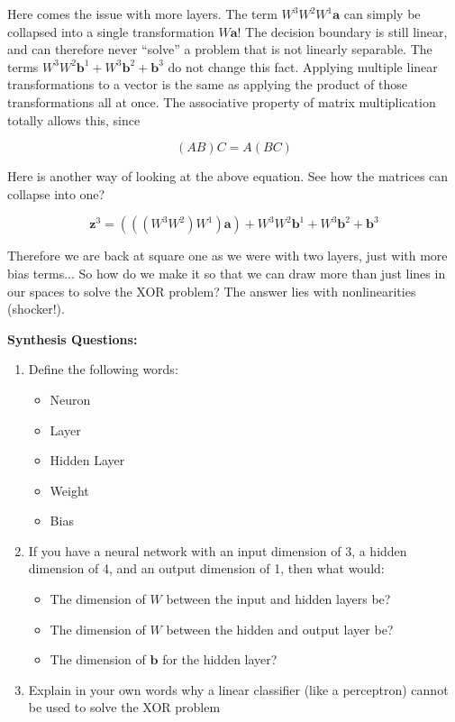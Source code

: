     Here comes the issue with more layers. The term $W^3W^2W^1\textbf{a}$ can simply be collapsed into a single transformation $W\textbf{a}$! The decision boundary is still linear, and can therefore never ``solve'' a problem that is not linearly separable. The terms $ W^3W^2\textbf{b}^1 + W^3\textbf{b}^2 + \textbf{b}^3$ do not change this fact. Applying multiple linear transformations to a vector is the same as applying the product of those transformations all at once. The associative property of matrix multiplication totally allows this, since

    $$(AB)C = A(BC)$$

    Here is another way of looking at the above equation. See how the matrices can collapse into one?

    $$\textbf{z}^3 = (((W^3W^2)W^1)\textbf{a}) + W^3W^2\textbf{b}^1 + W^3\textbf{b}^2 + \textbf{b}^3$$
    
    Therefore we are back at square one as we were with two layers, just with more bias terms... So how do we make it so that we can draw more than just lines in our spaces to solve the XOR problem? The answer lies with nonlinearities (shocker!).

\begin{questionbox}
\textbf{Synthesis Questions:}
\begin{enumerate}
    \item Define the following words:
    \begin{itemize}
        \item Neuron
        \item Layer
        \item Hidden Layer
        \item Weight
        \item Bias
    \end{itemize}
    \item If you have a neural network with an input dimension of 3, a hidden dimension of 4, and an output dimension of 1, then what would:
    \begin{itemize}
        \item The dimension of $W$ between the input and hidden layers be?
        \item The dimension of $W$ between the hidden and output layer be?
        \item The dimension of $\textbf{b}$ for the hidden layer?
    \end{itemize}
    \item Explain in your own words why a linear classifier (like a perceptron) cannot be used to solve the XOR problem
\end{enumerate}
\end{questionbox}

